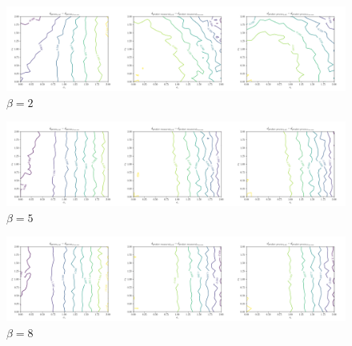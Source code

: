 \documentclass[a4paper,landscape,hidelinks,14pt]{extarticle}
\begin{document}
\begin{figure}[h!]
  \centering
  \includegraphics[width=.9\linewidth]{fig/beta-2.png}
  \caption{$ \beta = 2 $}
\end{figure}

\begin{figure}[h!]
  \centering
  \includegraphics[width=.9\linewidth]{fig/beta-5.png}
  \caption{$ \beta = 5 $}
\end{figure}

\begin{figure}[h!]
  \centering
  \includegraphics[width=.9\linewidth]{fig/beta-8.png}
  \caption{$ \beta = 8 $}
\end{figure}
\end{document}
